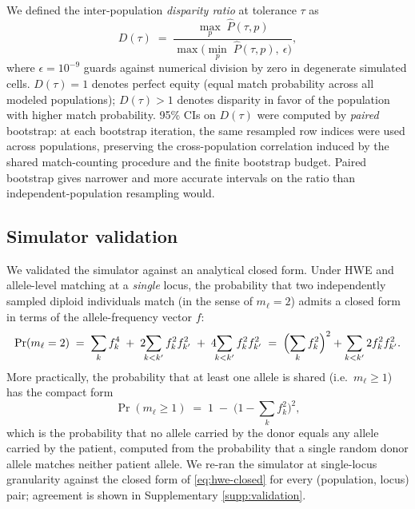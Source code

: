 \documentclass[11pt]{article}
\begin{document}
We defined the inter-population \emph{disparity ratio} at tolerance $\tau$ as
\begin{equation}
    D(\tau) \;=\; \frac{\max_{p}\; \hat{P}(\tau, p)}{\max\!\bigl(\min_{p}\; \hat{P}(\tau, p),\ \epsilon\bigr)},
    \label{eq:disparity}
\end{equation}
where $\epsilon = 10^{-9}$ guards against numerical division by zero in degenerate simulated cells. $D(\tau) = 1$ denotes perfect equity (equal match probability across all modeled populations); $D(\tau) > 1$ denotes disparity in favor of the population with higher match probability. 95\% CIs on $D(\tau)$ were computed by \emph{paired} bootstrap: at each bootstrap iteration, the same resampled row indices were used across populations, preserving the cross-population correlation induced by the shared match-counting procedure and the finite bootstrap budget. Paired bootstrap gives narrower and more accurate intervals on the ratio than independent-population resampling would.

\subsection{Simulator validation}
We validated the simulator against an analytical closed form. Under HWE and allele-level matching at a \emph{single} locus, the probability that two independently sampled diploid individuals match (in the sense of $m_\ell = 2$) admits a closed form in terms of the allele-frequency vector $f$:
\begin{equation}
    \Pr(m_\ell = 2) \;=\; \sum_k f_k^4 \;+\; 2 \!\!\sum_{k < k'} f_k^2 f_{k'}^2 \;+\; 4 \!\!\sum_{k < k'} f_k^2 f_{k'}^2
    \;=\; \Bigl(\sum_k f_k^2\Bigr)^2 + \sum_{k<k'} 2 f_k^2 f_{k'}^2.
\end{equation}
More practically, the probability that at least one allele is shared (i.e.\ $m_\ell \geq 1$) has the compact form
\begin{equation}
    \Pr(m_\ell \geq 1) \;=\; 1 \;-\; \bigl(1 - \textstyle\sum_k f_k^2\bigr)^2,
    \label{eq:hwe-closed}
\end{equation}
which is the probability that no allele carried by the donor equals any allele carried by the patient, computed from the probability that a single random donor allele matches neither patient allele. We re-ran the simulator at single-locus granularity against the closed form of \cref{eq:hwe-closed} for every (population, locus) pair; agreement is shown in Supplementary \cref{supp:validation}.
\end{document}
